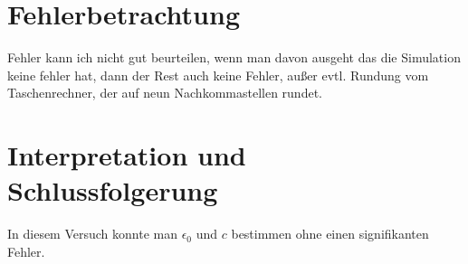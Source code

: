 \documentclass[a4paper]{article}
\begin{document}
\section{Fehlerbetrachtung} %
\label{ssub:Fehlerbetrachtung}
Fehler kann ich nicht gut beurteilen, wenn man davon ausgeht das die Simulation
keine fehler hat, dann der Rest auch keine Fehler, außer evtl. Rundung vom
Taschenrechner, der auf neun Nachkommastellen rundet.


\section{Interpretation und Schlussfolgerung} %
\label{ssub:Interpretation und Schlussfolgerung}
In diesem Versuch konnte man $\epsilon_0$ und $c$ bestimmen ohne einen signifikanten Fehler.
\end{document}

